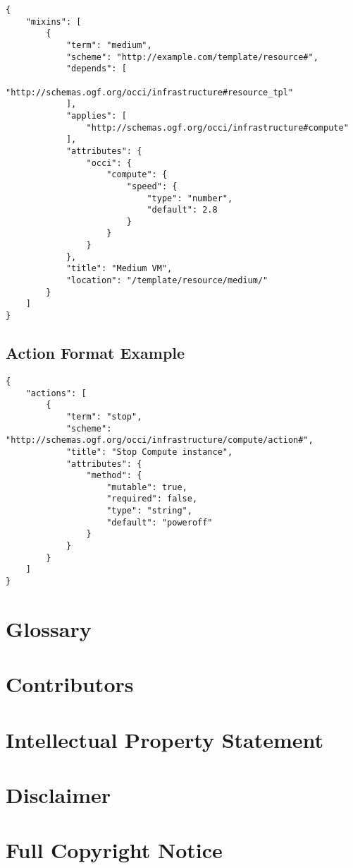 \documentclass[10pt,a4paper]{article}
\begin{document}
\begin{lstlisting}
{
    "mixins": [
        {
            "term": "medium",
            "scheme": "http://example.com/template/resource#",
            "depends": [
                "http://schemas.ogf.org/occi/infrastructure#resource_tpl"
            ],
            "applies": [
                "http://schemas.ogf.org/occi/infrastructure#compute"
            ],
            "attributes": {
                "occi": {
                    "compute": {
                        "speed": {
                            "type": "number",
                            "default": 2.8
                        }
                    }
                }
            },
            "title": "Medium VM",
            "location": "/template/resource/medium/"
        }
    ]
}
\end{lstlisting}

\subsection{Action Format Example}
\label{sec:example_action}

\begin{lstlisting}
{
    "actions": [
        {
            "term": "stop",
            "scheme": "http://schemas.ogf.org/occi/infrastructure/compute/action#",
            "title": "Stop Compute instance",
            "attributes": {
                "method": {
                    "mutable": true,
                    "required": false,
                    "type": "string",
                    "default": "poweroff"
                }
            }
        }
    ]
}
\end{lstlisting}

\section{Glossary}
\label{sec:glossary}


\section{Contributors}


\section{Intellectual Property Statement}


\section{Disclaimer}


\section{Full Copyright Notice}




\end{document}
